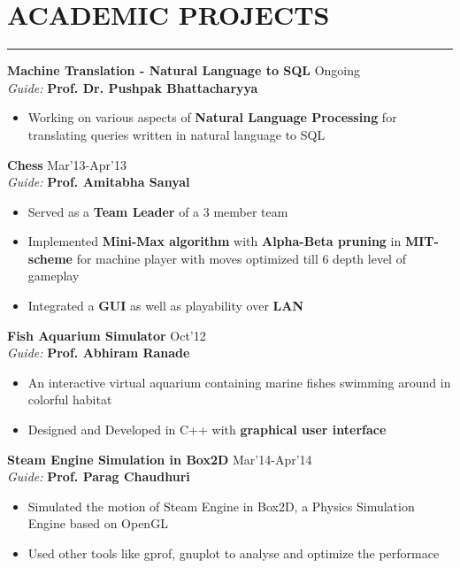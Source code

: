 \message{ !name(resume2.tex)}\documentclass[11pt]{book} %
\begin{document}
\section*{ACADEMIC PROJECTS}
\hrule
\medskip
\vspace{2mm}
\noindent \textbf{Machine Translation - Natural Language to SQL} \hfill Ongoing\\
\textit{Guide:} \textbf{Prof. Dr. Pushpak Bhattacharyya}
\vspace{-1mm}
\begin{itemize}
\itemsep-0.1em
\item Working on various aspects of \textbf{Natural Language Processing} for translating queries written in natural language to SQL
\end{itemize}
\vspace{-1mm}

\noindent \textbf{Chess} \hfill Mar'13-Apr'13\\
\textit{Guide:} \textbf{Prof. Amitabha Sanyal}
\vspace{-1mm}
\begin{itemize}
\itemsep-0.1em
\item Served as a \textbf{Team Leader} of a 3 member team
\item Implemented \textbf{Mini-Max algorithm} with \textbf{Alpha-Beta pruning} in \textbf{MIT-scheme} for machine player with 
moves optimized till 6 depth level of gameplay
\item Integrated a \textbf{GUI} as well as playability over \textbf{LAN}
\end{itemize}
\vspace{-1mm}
\pagebreak

\noindent \textbf{Fish Aquarium Simulator} \hfill Oct'12\\
\textit{Guide:} \textbf{Prof. Abhiram Ranade}
\vspace{-0.1mm}
\begin{itemize}
\itemsep-0.1em
\item An interactive virtual aquarium containing marine fishes swimming around in colorful habitat
\item Designed and Developed in C++ with \textbf{graphical user interface}
\end{itemize}
\vspace{-0mm}

\noindent \textbf{Steam Engine Simulation in Box2D} \hfill Mar'14-Apr'14\\
\textit{Guide:} \textbf{Prof. Parag Chaudhuri}
\vspace{-0.1mm}
\begin{itemize}
\itemsep-0.1em
\item Simulated the motion of Steam Engine in Box2D, a Physics Simulation Engine based on OpenGL
\item Used other tools like gprof, gnuplot to analyse and optimize the performace
\end{itemize}
\vspace{-5mm}
\end{document}
